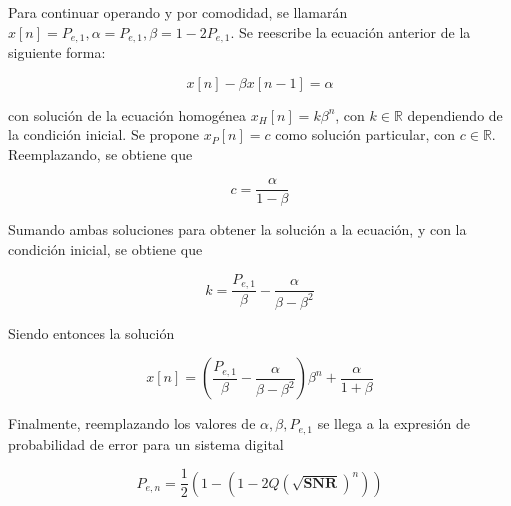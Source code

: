 Para continuar operando y por comodidad, se llamarán $x[n]=P_{e,1},\alpha=P_{e,1},\beta=1-2P_{e,1}$. Se reescribe la ecuación anterior de la siguiente forma:

\begin{equation}
x[n]-\beta x[n-1]=\alpha
\end{equation} 

con solución de la ecuación homogénea $x_H[n]=k\beta^n$, con $k \in \mathbb{R}$ dependiendo de la condición inicial. Se propone $x_P[n]=c$ como solución particular, con $c\in\mathbb{R}$. Reemplazando, se obtiene que 

\begin{equation}
c=\frac{\alpha}{1-\beta}
\end{equation} 

Sumando ambas soluciones para obtener la solución a la ecuación, y con la condición inicial, se obtiene que 

\begin{equation}
k = \frac{P_{e,1}}{\beta}-\frac{\alpha}{\beta-\beta^2}
\end{equation} 

Siendo entonces la solución

\begin{equation}
x[n]=(\frac{P_{e,1}}{\beta}-\frac{\alpha}{\beta-\beta^2})\beta^n+\frac{\alpha}{1+\beta}
\end{equation} 

Finalmente, reemplazando los valores de $\alpha,\beta,P_{e,1}$ se llega a la expresión de probabilidad de error para un sistema digital

\begin{equation}
P_{e,n}=\frac{1}{2}(1-(1-2Q(\sqrt{\textbf{SNR}})^n))
\end{equation} 